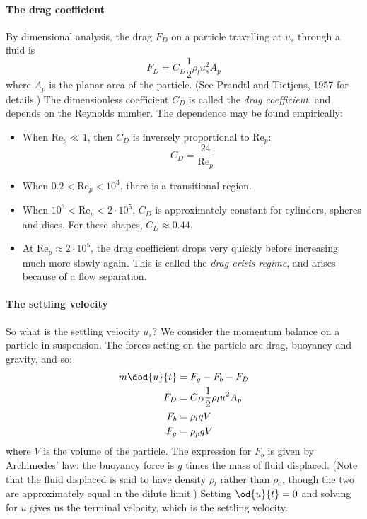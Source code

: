 \paragraph{The drag coefficient} By dimensional analysis, the drag $F_D$ on a particle travelling at $u_s$ through a fluid is
\begin{equation}
 F_D = C_D\frac{1}{2}\rho_lu_s^2A_p
\end{equation}
where $A_p$ is the planar area of the particle. (See Prandtl and Tietjens, 1957 for details.) The dimensionless coefficient $C_D$ is called the \textit{drag coefficient}, and depends on the Reynolds number. The dependence may be found empirically:
\begin{itemize}
	\item When $\mathrm{Re}_p\ll1$, then $C_D$ is inversely proportional to $\mathrm{Re}_p$:
	\begin{equation}
    		C_D = \frac{24}{\mathrm{Re}_p}
	\end{equation}
	\item When $0.2 < \mathrm{Re}_p < 10^3$, there is a transitional region.
	\item When $10^3 < \mathrm{Re}_p < 2\cdot10^5$, $C_D$ is approximately constant for cylinders, spheres and discs. For these shapes, $C_D \approx 0.44$.
	\item At $\mathrm{Re}_p\approx2\cdot10^5$, the drag coefficient drops very quickly before increasing much more slowly again. This is called the \textit{drag crisis regime}, and arises because of a flow separation.
\end{itemize}

\paragraph{The settling velocity} So what is the settling velocity $u_s$? We consider the momentum balance on a particle in suspension. The forces acting on the particle are drag, buoyancy and gravity, and so:
\begin{align}
    m\dod{u}{t} &= F_g - F_b - F_D \\
    F_D            &= C_D\frac{1}{2}\rho_lu^2A_p \\
    F_b            &= \rho_lgV \\
    F_g            &= \rho_pgV
\end{align}
where $V$ is the volume of the particle. The expression for $F_b$ is given by Archimedes' law: the buoyancy force is $g$ times the mass of fluid displaced. (Note that the fluid displaced is said to have density $\rho_l$ rather than $\rho_0$, though the two are approximately equal in the dilute limit.) Setting $\od{u}{t} = 0$ and solving for $u$ gives us the terminal velocity, which is the settling velocity.

